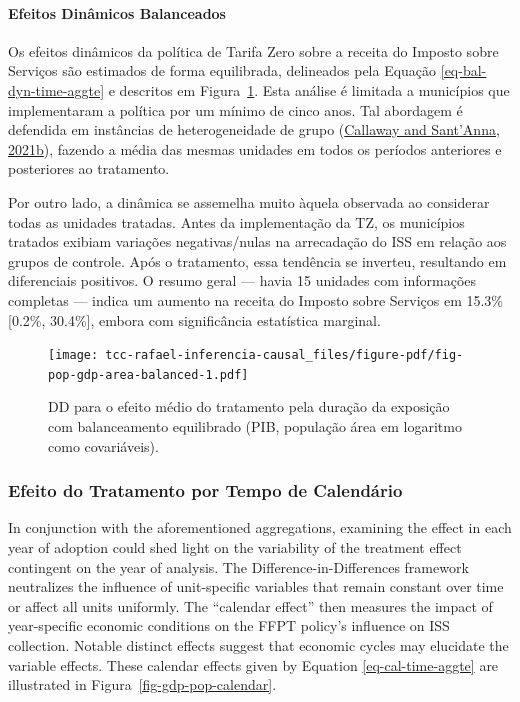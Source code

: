 \documentclass[12pt, a4paper, twoside]{article}
\numberwithin{equation}{subsection} %
\begin{document}
\hypertarget{efeitos-dinuxe2micos-balanceados}{%
\paragraph{Efeitos Dinâmicos
Balanceados}\label{efeitos-dinuxe2micos-balanceados}}

Os efeitos dinâmicos da política de Tarifa Zero sobre a receita do
Imposto sobre Serviços são estimados de forma equilibrada, delineados
pela Equação \eqref{eq-bal-dyn-time-aggte} e descritos em
Figura~\ref{fig-pop-gdp-area-balanced}. Esta análise é limitada a
municípios que implementaram a política por um mínimo de cinco anos. Tal
abordagem é defendida em instâncias de heterogeneidade de grupo
(\protect\hyperlink{ref-did_r}{Callaway and Sant'Anna, 2021b}), fazendo
a média das mesmas unidades em todos os períodos anteriores e
posteriores ao tratamento.

Por outro lado, a dinâmica se assemelha muito àquela observada ao
considerar todas as unidades tratadas. Antes da implementação da TZ, os
municípios tratados exibiam variações negativas/nulas na arrecadação do
ISS em relação aos grupos de controle. Após o tratamento, essa tendência
se inverteu, resultando em diferenciais positivos. O resumo geral ---
havia 15 unidades com informações completas --- indica um aumento na
receita do Imposto sobre Serviços em 15.3\% {[}0.2\%, 30.4\%{]}, embora
com significância estatística marginal.

\begin{figure}[H]

{\centering \texttt{[image: tcc-rafael-inferencia-causal\_files/figure-pdf/fig-pop-gdp-area-balanced-1.pdf]}

}

\caption{\label{fig-pop-gdp-area-balanced}DD para o efeito médio do
tratamento pela duração da exposição com balanceamento equilibrado (PIB,
população área em logaritmo como covariáveis).}

\end{figure}

\hypertarget{efeito-do-tratamento-por-tempo-de-calenduxe1rio}{%
\subsubsection{Efeito do Tratamento por Tempo de
Calendário}\label{efeito-do-tratamento-por-tempo-de-calenduxe1rio}}

In conjunction with the aforementioned aggregations, examining the
effect in each year of adoption could shed light on the variability of
the treatment effect contingent on the year of analysis. The
Difference-in-Differences framework neutralizes the influence of
unit-specific variables that remain constant over time or affect all
units uniformly. The ``calendar effect'' then measures the impact of
year-specific economic conditions on the FFPT policy's influence on ISS
collection. Notable distinct effects suggest that economic cycles may
elucidate the variable effects. These calendar effects given by Equation
\eqref{eq-cal-time-aggte} are illustrated in
Figura~\ref{fig-gdp-pop-calendar}.
\end{document}
